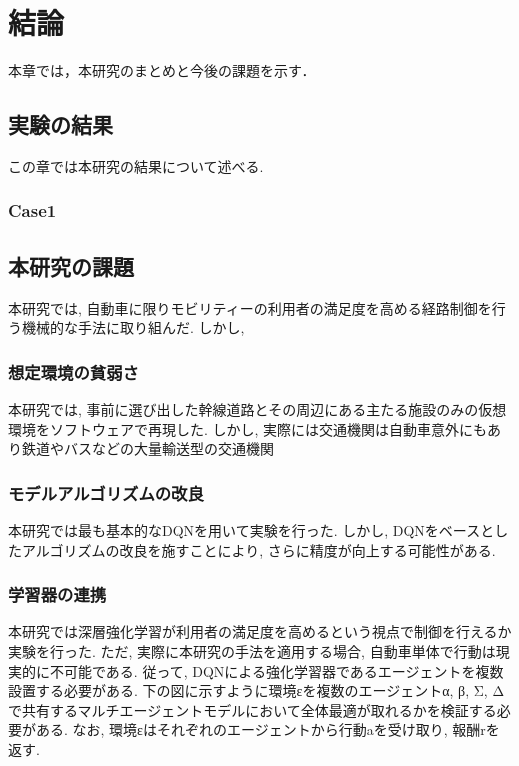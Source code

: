 \chapter{結論}
\label{conclusion}

本章では，本研究のまとめと今後の課題を示す．

\section{実験の結果}

この章では本研究の結果について述べる.


\subsection{Case1 }

\section{本研究の課題}

本研究では, 自動車に限りモビリティーの利用者の満足度を高める経路制御を行う機械的な手法に取り組んだ.
しかし,

\subsection{想定環境の貧弱さ}

本研究では, 事前に選び出した幹線道路とその周辺にある主たる施設のみの仮想環境をソフトウェアで再現した. 
しかし, 実際には交通機関は自動車意外にもあり鉄道やバスなどの大量輸送型の交通機関

\subsection{モデルアルゴリズムの改良}

本研究では最も基本的なDQNを用いて実験を行った. しかし, DQNをベースとしたアルゴリズムの改良を施すことにより, さらに精度が向上する可能性がある.

\subsection{学習器の連携}

本研究では深層強化学習が利用者の満足度を高めるという視点で制御を行えるか実験を行った.
ただ, 実際に本研究の手法を適用する場合, 自動車単体で行動は現実的に不可能である.
従って, DQNによる強化学習器であるエージェントを複数設置する必要がある. 下の図に示すように環境εを複数のエージェントα, β, Σ, Δで共有するマルチエージェントモデルにおいて全体最適が取れるかを検証する必要がある.
なお, 環境εはそれぞれのエージェントから行動aを受け取り, 報酬rを返す.



